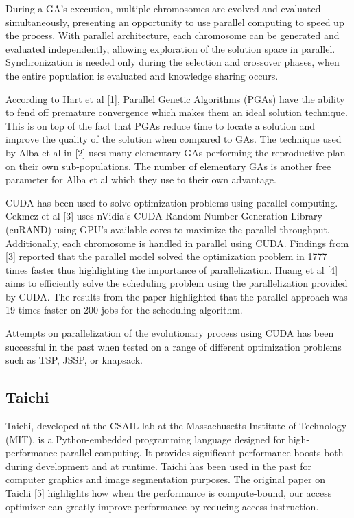\documentclass[conference]{IEEEtran}
\begin{document}
During a GA's execution, multiple chromosomes are evolved and evaluated
simultaneously, presenting an opportunity to use parallel computing to speed up
the process. With parallel architecture, each chromosome can be generated and
evaluated independently, allowing exploration of the solution space in
parallel. Synchronization is needed only during the selection and crossover
phases, when the entire population is evaluated and knowledge sharing occurs.

According to Hart et al [1], Parallel Genetic Algorithms (PGAs) have the
ability to fend off premature convergence which makes them an ideal solution
technique. This is on top of the fact that PGAs reduce time to locate a
solution and improve the quality of the solution when compared to GAs. The
technique used by Alba et al in [2] uses many elementary GAs performing the
reproductive plan on their own sub-populations. The number of elementary GAs is
another free parameter for Alba et al which they use to their own advantage.

CUDA has been used to solve optimization problems using parallel computing.
Cekmez et al [3] uses nVidia's CUDA Random Number Generation Library (cuRAND)
using GPU's available cores to maximize the parallel throughput. Additionally,
each chromosome is handled in parallel using CUDA. Findings from [3] reported
that the parallel model solved the optimization problem in 1777 times faster
thus highlighting the importance of parallelization. Huang et al [4] aims to
efficiently solve the scheduling problem using the parallelization provided by
CUDA. The results from the paper highlighted that the parallel approach was 19
times faster on 200 jobs for the scheduling algorithm.

Attempts on parallelization of the evolutionary process using CUDA has been
successful in the past when tested on a range of different optimization
problems such as TSP, JSSP, or knapsack.

\subsection{Taichi}
Taichi, developed at the CSAIL lab at the Massachusetts Institute of Technology
(MIT), is a Python-embedded programming language designed for high-performance
parallel computing. It provides significant performance boosts both during
development and at runtime. Taichi has been used in the past for computer
graphics and image segmentation purposes. The original paper on Taichi [5]
highlights how when the performance is compute-bound, our access optimizer can
greatly improve performance by reducing access instruction.
\end{document}
